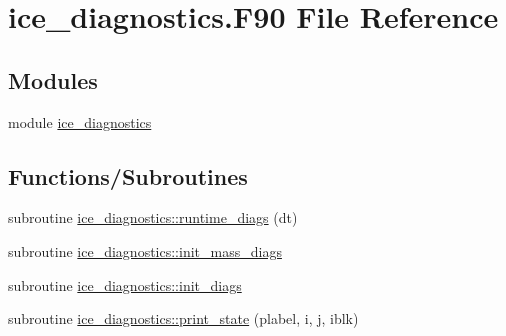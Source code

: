 \hypertarget{ice__diagnostics_8F90}{
\section{ice\_\-diagnostics.F90 File Reference}
\label{ice__diagnostics_8F90}
}
\subsection*{Modules}
\begin{DoxyCompactItemize}
\item 
module \hyperlink{namespaceice__diagnostics}{ice\_\-diagnostics}
\end{DoxyCompactItemize}
\subsection*{Functions/Subroutines}
\begin{DoxyCompactItemize}
\item 
subroutine \hyperlink{namespaceice__diagnostics_a29d618a92dc5fe3345aad30da147f0b1}{ice\_\-diagnostics::runtime\_\-diags} (dt)
\item 
subroutine \hyperlink{namespaceice__diagnostics_a5bf9b233f90e5bf0702b9c358a71f42d}{ice\_\-diagnostics::init\_\-mass\_\-diags}
\item 
subroutine \hyperlink{namespaceice__diagnostics_a32eee6ddd1b9f9450d3efabd6c21a54b}{ice\_\-diagnostics::init\_\-diags}
\item 
subroutine \hyperlink{namespaceice__diagnostics_adbff5d6397108c366de11a71a997b9eb}{ice\_\-diagnostics::print\_\-state} (plabel, i, j, iblk)
\end{DoxyCompactItemize}
